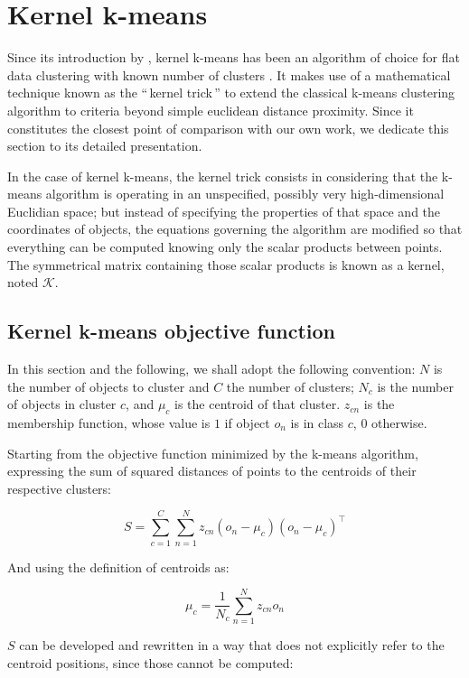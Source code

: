\documentclass[twoside,11pt]{article}
\newcommand{\gl}[1]{``\,#1\,''} %
\begin{document}
\section{Kernel k-means} \label{sec:kkmeans}

Since its introduction by \citet{Girolami:2002:MKC:2325785.2326903}, kernel k-means has been an algorithm of choice for flat data clustering with known number of clusters \citep{Kulis2008, Roth:2003:OCP:960254.960291}. It makes use of a mathematical technique known as the \gl{kernel trick} to extend the classical k-means clustering algorithm \citep{macQueenBsmsp67} to criteria beyond simple euclidean distance proximity. Since it constitutes the closest point of comparison with our own work, we dedicate this section to its detailed presentation.

In the case of kernel k-means, the kernel trick consists in considering that the k-means algorithm is operating in an unspecified, possibly very high-dimensional Euclidian space; but instead of specifying the properties of that space and the coordinates of objects, the equations governing the algorithm are modified so that everything can be computed knowing only the scalar products between points. The symmetrical matrix  containing those scalar products is known as a kernel, noted $\mathcal{K}$.

\subsection{Kernel k-means objective function}

In this section and the following, we shall adopt the following convention: $N$ is the number of objects to cluster and $C$ the number of clusters; $N_c$ is the number of objects in cluster $c$, and $\mu_c$ is the centroid of that cluster. $z_{cn}$ is the membership function, whose value is $1$ if object $o_n$ is in class $c$, $0$ otherwise.

Starting from the objective function minimized by the k-means algorithm, expressing the sum of squared distances of points to the centroids of their respective clusters:

\[
S = \sum_{c=1}^{C} \sum_{n=1}^{N} z_{cn} \left(o_n-\mu_c\right)\left(o_n-\mu_c\right)^\top \label{eq:S}
\]

And using the definition of centroids as:

\[
\mu_c = \frac{1}{N_c}\sum_{n=1}^{N}z_{cn}o_n
\]

$S$ can be developed and rewritten in a way that does not explicitly refer to the centroid positions, since those cannot be computed:
\end{document}

